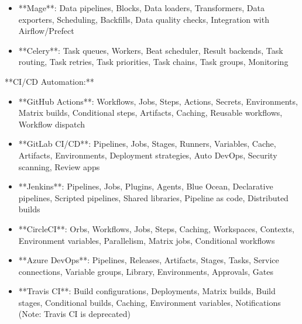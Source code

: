 \documentclass[11pt,a4paper]{article}
\begin{document}
\begin{itemize}
\item **Mage**: Data pipelines, Blocks, Data loaders, Transformers, Data exporters, Scheduling, Backfills, Data quality checks, Integration with Airflow/Prefect
\end{itemize}

\begin{itemize}
\item **Celery**: Task queues, Workers, Beat scheduler, Result backends, Task routing, Task retries, Task priorities, Task chains, Task groups, Monitoring
\end{itemize}

**CI/CD Automation:**

\begin{itemize}
\item **GitHub Actions**: Workflows, Jobs, Steps, Actions, Secrets, Environments, Matrix builds, Conditional steps, Artifacts, Caching, Reusable workflows, Workflow dispatch
\end{itemize}

\begin{itemize}
\item **GitLab CI/CD**: Pipelines, Jobs, Stages, Runners, Variables, Cache, Artifacts, Environments, Deployment strategies, Auto DevOps, Security scanning, Review apps
\end{itemize}

\begin{itemize}
\item **Jenkins**: Pipelines, Jobs, Plugins, Agents, Blue Ocean, Declarative pipelines, Scripted pipelines, Shared libraries, Pipeline as code, Distributed builds
\end{itemize}

\begin{itemize}
\item **CircleCI**: Orbs, Workflows, Jobs, Steps, Caching, Workspaces, Contexts, Environment variables, Parallelism, Matrix jobs, Conditional workflows
\end{itemize}

\begin{itemize}
\item **Azure DevOps**: Pipelines, Releases, Artifacts, Stages, Tasks, Service connections, Variable groups, Library, Environments, Approvals, Gates
\end{itemize}

\begin{itemize}
\item **Travis CI**: Build configurations, Deployments, Matrix builds, Build stages, Conditional builds, Caching, Environment variables, Notifications (Note: Travis CI is deprecated)
\end{itemize}
\end{document}
